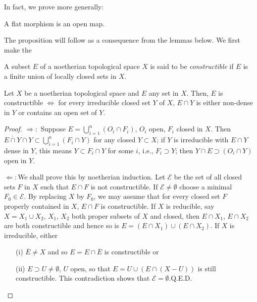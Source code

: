 In fact, we prove more generally:


\setcounter{prop}{3}
\begin{prop}\label{chap3-prop3.3.4}
A flat morphism is an open map.
\end{prop}

The proposition will follow as a consequence from the lemmas below. We
first make the

\begin{defi*}
A subset $E$ of a noetherian topological space $X$ is said to be {\em
  constructible} if $E$ is a finite union of locally closed sets in $X$.
\end{defi*}

\setcounter{lemma}{4}
\begin{lemma}\label{chap3-lem3.3.5}
Let $X$ be a noetherian topological space and $E$ any set in
$X$. Then, $E$ is constructible $\Leftrightarrow$ for every
irreducible closed set $Y$ of $X$, $E\cap Y$ is either non-dense in
$Y$ or contains an open set of $Y$.
\end{lemma}

\begin{proof}
$\Rightarrow:$ Suppose $E=\bigcup\limits^{n}_{i=1}(O_{i}\cap F_{i})$,
  $O_{i}$ open, $F_{i}$ closed in $X$. Then $\overline{E\cap Y}\cap
  Y\subset \bigcup\limits^{n}_{i=1}(F_{i}\cap Y)$ for any closed
  $Y\subset X$; if $Y$ is irreducible with $E\cap Y$ dense in $Y$,
  this means $Y\subset F_{i}\cap Y$ for some $i$, i.e., $F_{i}\supset
  Y$; then $Y\cap E\supset (O_{i}\cap Y)$ open in $Y$.

$\Leftarrow :$\pageoriginale We shall prove this by noetherian
  induction. Let $\mathscr{E}$ be the set of all closed sets $F$ in
  $X$ such that $E\cap F$ is not constructible. If $\mathscr{E}\neq
  \emptyset$ choose a minimal $F_{0}\in \mathscr{E}$. By replacing $X$
  by $F_{0}$, we may assume that for every closed set $F$ properly
  contained in $X$, $E\cap F$ is constructible. If $X$ is reducible,
  say $X=X_{1}\cup X_{2}$, $X_{1}$, $X_{2}$ both proper subsets of $X$
  and closed, then $E\cap X_{1}$, $E\cap X_{2}$ are both constructible
  and hence so is $E=(E\cap X_{1})\cup (E\cap X_{2})$. If $X$ is
  irreducible, either
\begin{itemize}
\item[(i)] $\overline{E}\neq X$ and so $E=E\cap \overline{E}$ is
  constructible or

\item[(ii)] $E\supset U\neq \emptyset$, $U$ open, so that $E=U\cup
  (E\cap (X-U))$ is still constructible. This contradiction shows that
  $\mathscr{E}=\emptyset$.\hfill Q.E.D.
\end{itemize}
\end{proof}

